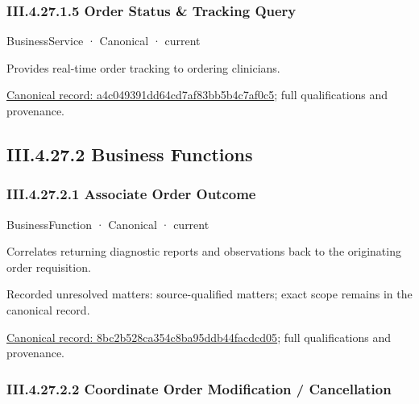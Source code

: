 \subsubsection*{III.4.27.1.5 Order Status \& Tracking Query}
\label{navigation:III.4.27.1.5}

\label{element:a4c049391dd64cd7af83bb5b4c7af0c5}
{\small BusinessService · Canonical · current}\par

Provides real-time order tracking to ordering clinicians.


{\footnotesize \href{../../../../continuum/business/business-service/a4c049391dd64cd7af83bb5b4c7af0c5.md}{Canonical record: a4c049391dd64cd7af83bb5b4c7af0c5}; full qualifications and provenance.}\par
\subsection*{III.4.27.2 Business Functions}
\label{navigation:III.4.27.2}

\subsubsection*{III.4.27.2.1 Associate Order Outcome}
\label{navigation:III.4.27.2.1}

\label{element:8bc2b528ca354c8ba95ddb44facdcd05}
{\small BusinessFunction · Canonical · current}\par

Correlates returning diagnostic reports and observations back to the originating order requisition.


{\small Recorded unresolved matters: source-qualified matters; exact scope remains in the canonical record.}\par
{\footnotesize \href{../../../../continuum/business/business-function/8bc2b528ca354c8ba95ddb44facdcd05.md}{Canonical record: 8bc2b528ca354c8ba95ddb44facdcd05}; full qualifications and provenance.}\par
\subsubsection*{III.4.27.2.2 Coordinate Order Modification / Cancellation}
\label{navigation:III.4.27.2.2}

